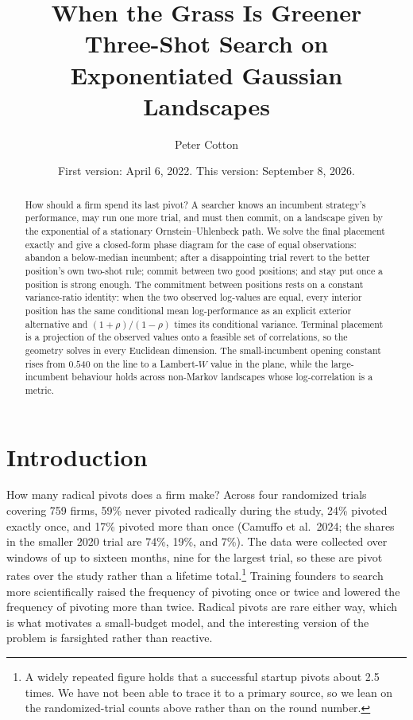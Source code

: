 \documentclass[11pt]{article}
\title{When the Grass Is Greener\\[4pt]
{\large Three-Shot Search on Exponentiated Gaussian Landscapes}}
\author{Peter Cotton}
\date{\normalsize First version: April 6, 2022. This version: September 8, 2026.}
\theoremstyle{itheads}
\begin{document}
\maketitle

\begin{abstract}
\noindent How should a firm spend its last pivot? A searcher knows an
incumbent strategy's performance, may run one more trial, and must
then commit, on a landscape given by the exponential of a stationary
Ornstein--Uhlenbeck path. We solve the final placement exactly and
give a closed-form phase diagram for the case of equal observations:
abandon a below-median incumbent; after a disappointing trial revert
to the better position's own two-shot rule; commit between two good
positions; and stay put once a position is strong enough. The commitment between positions
rests on a constant variance-ratio identity: when the two observed
log-values are equal, every interior position has
the same conditional mean log-performance as an explicit exterior
alternative and $(1+\rho)/(1-\rho)$ times its conditional variance. Terminal placement is a projection of the observed values onto a
feasible set of correlations, so the geometry solves in every Euclidean
dimension. The small-incumbent opening constant rises from $0.540$ on
the line to a Lambert-$W$ value in the plane, while the large-incumbent
behaviour holds across non-Markov landscapes whose log-correlation is a
metric.
\end{abstract}

\section{Introduction}

How many radical pivots does a firm make? Across four randomized
trials covering 759 firms, 59\% never pivoted radically during the
study, 24\% pivoted exactly once, and 17\% pivoted more than once
(Camuffo et al.\ 2024; the shares in the smaller 2020 trial are
74\%, 19\%, and 7\%). The data were collected over windows of up to
sixteen months, nine for the largest trial, so these are pivot rates
over the study rather than a lifetime total.\footnote{A widely
repeated figure holds that a successful startup pivots about 2.5
times. We have not been able to trace it to a primary source, so we
lean on the randomized-trial counts above rather than on the round
number.} Training founders to search more scientifically raised the
frequency of pivoting once or twice and lowered the frequency of
pivoting more than twice. Radical pivots are rare either way, which is
what motivates a small-budget model, and the interesting version of
the problem is farsighted rather than reactive.
\end{document}
